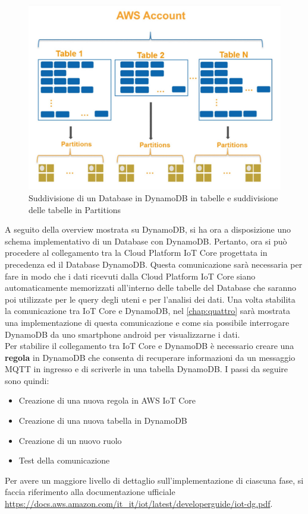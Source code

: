 \begin{figure}
	\begin{center}
		\includegraphics[width=0.6\columnwidth]{images/dynamodb_2}
	\end{center}
	\caption{Suddivisione di un Database in DynamoDB in tabelle e suddivisione delle tabelle in Partitions}
	\label{fig:dynamodb_2}
\end{figure}

A seguito della overview mostrata su DynamoDB, si ha ora a disposizione uno schema implementativo di un Database con DynamoDB. Pertanto, ora si può procedere al collegamento tra la Cloud Platform IoT Core progettata in precedenza ed il Database DynamoDB. Questa comunicazione sarà necessaria per fare in modo che i dati ricevuti dalla Cloud Platform IoT Core siano automaticamente memorizzati all'interno delle tabelle del Database che saranno poi utilizzate per le query degli uteni e per l'analisi dei dati. Una volta stabilita la comunicazione tra IoT Core e DynamoDB, nel \autoref{chap:quattro} sarà mostrata una implementazione di questa comunicazione e come sia possibile interrogare DynamoDB da uno smartphone android per visualizzarne i dati.\\
Per stabilire il collegamento tra IoT Core e DynamoDB è necessario creare una \textbf{regola} in DynamoDB che consenta di recuperare informazioni da un messaggio MQTT in ingresso e di scriverle in una tabella DynamoDB. I passi da seguire sono quindi:
\begin{itemize}
	\item Creazione di una nuova regola in AWS IoT Core
	\item Creazione di una nuova tabella in DynamoDB
	\item Creazione di un nuovo ruolo
	\item Test della comunicazione
\end{itemize}
Per avere un maggiore livello di dettaglio sull'implementazione di ciascuna fase, si faccia riferimento alla documentazione ufficiale \url{https://docs.aws.amazon.com/it_it/iot/latest/developerguide/iot-dg.pdf}.

